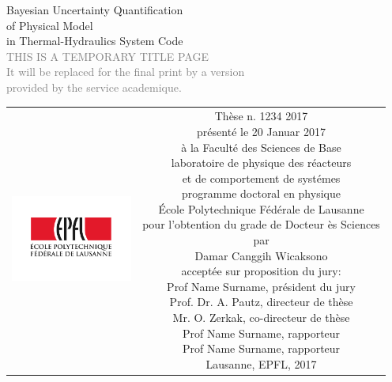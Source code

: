 \begin{titlepage}
\begin{center}
\sffamily


\null\vspace{2cm}
{\huge Bayesian Uncertainty Quantification \\[12pt] of Physical Model \\[12pt] in Thermal-Hydraulics System Code} \\[24pt] 
\textcolor{gray}{\small{THIS IS A TEMPORARY TITLE PAGE \\ It will be replaced for the final print by a version \\ provided by the service academique.}}
    
\vfill

\begin{tabular} {cc}
\parbox{0.3\textwidth}{\includegraphics[width=4cm]{images/epfl}}
&
\parbox{0.7\textwidth}{%
	Thèse n. 1234 2017\\
	présenté le 20 Januar 2017\\
	à la Faculté des Sciences de Base\\
	laboratoire de physique des réacteurs \\
	et de comportement de systémes\\
	programme doctoral en physique\\
%
	École Polytechnique Fédérale de Lausanne\\[6pt]
	pour l'obtention du grade de Docteur ès Sciences\\
	par\\ [4pt]
	\null \hspace{3em} Damar Canggih Wicaksono\\[9pt]
%
\small
acceptée sur proposition du jury:\\[4pt]
%
    Prof Name Surname, président du jury\\
    Prof. Dr. A. Pautz, directeur de thèse\\
    Mr. O. Zerkak, co-directeur de thèse\\
    Prof Name Surname, rapporteur\\
    Prof Name Surname, rapporteur\\[12pt]
%
Lausanne, EPFL, 2017}
\end{tabular}
\end{center}
\vspace{2cm}
\end{titlepage}




